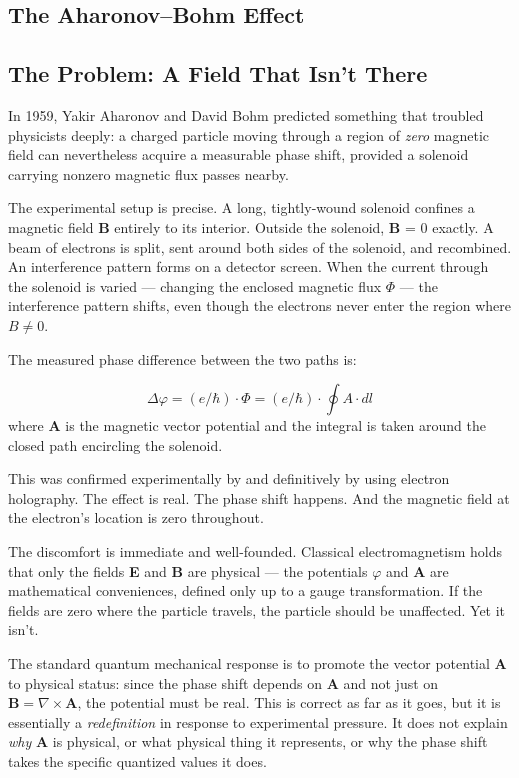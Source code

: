 \documentclass[aps,prd,preprint,superscriptaddress,longbibliography,floatfix]{revtex4-2}
\theoremstyle{remark}
\begin{document}
\subsection{The Aharonov--Bohm Effect}



\subsection{The Problem: A Field That Isn't There}

In 1959, Yakir Aharonov and David Bohm predicted something that troubled physicists deeply: a charged particle moving through a region of \textit{zero} magnetic field can nevertheless acquire a measurable phase shift, provided a solenoid carrying nonzero magnetic flux passes nearby.

The experimental setup is precise. A long, tightly-wound solenoid confines a magnetic field \textbf{B} entirely to its interior. Outside the solenoid, \textbf{B} = 0 exactly. A beam of electrons is split, sent around both sides of the solenoid, and recombined. An interference pattern forms on a detector screen. When the current through the solenoid is varied --- changing the enclosed magnetic flux $\Phi$ --- the interference pattern shifts, even though the electrons never enter the region where $B \neq 0$.

The measured phase difference between the two paths is:


\begin{equation}
    \Delta\varphi = (e/\hbar) \cdot \Phi = (e/\hbar) \cdot \oint A \cdot dl
\end{equation}
where \textbf{A} is the magnetic vector potential and the integral is taken around the closed path encircling the solenoid.

This was confirmed experimentally by \cite{Chambers1960} and definitively by \cite{Tonomuraetal1986} using electron holography. The effect is real. The phase shift happens. And the magnetic field at the electron's location is zero throughout.

The discomfort is immediate and well-founded. Classical electromagnetism holds that only the fields \textbf{E} and \textbf{B} are physical --- the potentials $\varphi$ and \textbf{A} are mathematical conveniences, defined only up to a gauge transformation. If the fields are zero where the particle travels, the particle should be unaffected. Yet it isn't.

The standard quantum mechanical response is to promote the vector potential \textbf{A} to physical status: since the phase shift depends on \textbf{A} and not just on $\textbf{B} = \nabla \times \textbf{A}$, the potential must be real. This is correct as far as it goes, but it is essentially a \textit{redefinition} in response to experimental pressure. It does not explain \textit{why} \textbf{A} is physical, or what physical thing it represents, or why the phase shift takes the specific quantized values it does.
\end{document}
